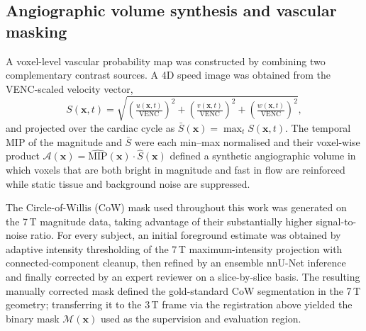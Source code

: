 \subsection*{Angiographic volume synthesis and vascular masking}

A voxel-level vascular probability map was constructed by combining
two complementary contrast sources. A 4D speed image was obtained from
the VENC-scaled velocity vector,
\begin{equation}
    S(\mathbf{x}, t) = \sqrt{
        \left(\tfrac{u(\mathbf{x},t)}{\mathrm{VENC}}\right)^2 +
        \left(\tfrac{v(\mathbf{x},t)}{\mathrm{VENC}}\right)^2 +
        \left(\tfrac{w(\mathbf{x},t)}{\mathrm{VENC}}\right)^2},
\end{equation}
and projected over the cardiac cycle as
$\bar{S}(\mathbf{x}) = \max_t S(\mathbf{x},t)$. The temporal MIP of the
magnitude and $\bar{S}$ were each min--max normalised and their
voxel-wise product
$\mathcal{A}(\mathbf{x}) = \hat{\mathrm{MIP}}(\mathbf{x}) \cdot
\hat{S}(\mathbf{x})$ defined a synthetic angiographic volume in which
voxels that are both bright in magnitude and fast in flow are reinforced
while static tissue and background noise are suppressed.

The Circle-of-Willis (CoW) mask used throughout this work was generated
on the 7\,T magnitude data, taking advantage of their substantially
higher signal-to-noise ratio. For every subject, an initial foreground
estimate was obtained by adaptive intensity thresholding of the 7\,T
maximum-intensity projection with connected-component cleanup, then
refined by an ensemble nnU-Net inference and finally corrected by an
expert reviewer on a slice-by-slice basis. The resulting manually
corrected mask defined the gold-standard CoW segmentation in the 7\,T
geometry; transferring it to the 3\,T frame via the registration above
yielded the binary mask $\mathcal{M}(\mathbf{x})$ used as the
supervision and evaluation region.

